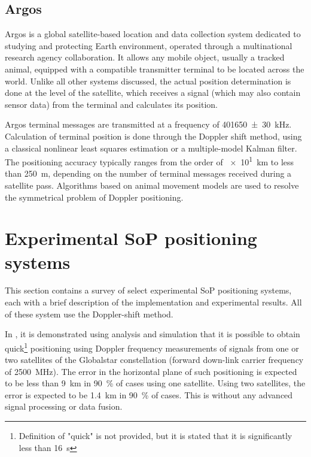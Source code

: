 \subsection{Argos}
Argos is a global satellite-based location and data collection system dedicated to studying and protecting Earth environment, operated through a multinational research agency collaboration. It allows any mobile object, usually a tracked animal, equipped with a compatible transmitter terminal to be located across the world\cite{sat17}. Unlike all other systems discussed, the actual position determination is done at the level of the satellite, which receives a signal (which may also contain sensor data) from the terminal and calculates its position.

Argos terminal messages are transmitted at a frequency of \qty{401650(30)}{kHz}. Calculation of terminal position is done through the Doppler shift method, using a classical nonlinear least squares estimation or a multiple-model Kalman filter. The positioning accuracy typically ranges from the order of \qty{e1}{km} to less than \qty{250}{m}, depending on the number of terminal messages received during a satellite pass\cite{sop09}. Algorithms based on animal movement models are used to resolve the symmetrical problem of Doppler positioning\cite{sat17}.



\section{Experimental SoP positioning systems}
This section contains a survey of select experimental SoP positioning systems, each with a brief description of the implementation and experimental results. All of these system use the Doppler-shift method.

In \cite{sop07}, it is demonstrated using analysis and simulation that it is possible to obtain quick\footnote{Definition of "quick" is not provided, but it is stated that it is significantly less than \qty{16}{\s}} positioning using Doppler frequency measurements of signals from one or two satellites of the Globalstar constellation (forward down-link carrier frequency of \qty{2500}{\mega\hertz}). The error in the horizontal plane of such positioning is expected to be less than \qty{9}{\km} in \qty{90}{\percent} of cases using one satellite. Using two satellites, the error is expected to be \qty{1.4}{\km} in \qty{90}{\percent} of cases. This is without any advanced signal processing or data fusion.

